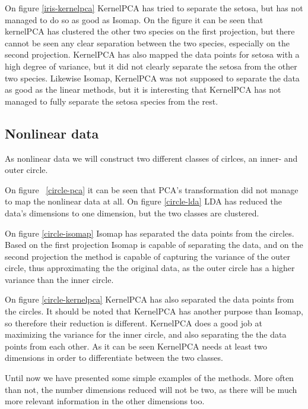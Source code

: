 On figure \ref{iris-kernelpca} KernelPCA has tried to separate the setosa, but has not managed to do so as good as Isomap. On the figure it can be seen that kernelPCA has clustered the other two species on the first projection, but there cannot be seen any clear separation between the two species, especially on the second projection. KernelPCA has also mapped the data points for setosa with a high degree of variance, but it did not clearly separate the setosa from the other two species. Likewise Isomap, KernelPCA was not supposed to separate the data as good as the linear methods, but it is interesting that KernelPCA has not managed to fully separate the setosa species from the rest.




\subsection{Nonlinear data}
As nonlinear data we will construct two different classes of cirlces, an inner- and outer circle.


On figure ~\ref{circle-pca} it can be seen that PCA's transformation did not manage to map the nonlinear data at all. On figure \ref{circle-lda} LDA has reduced the data's dimensions to one dimension, but the two classes are clustered.


On figure \ref{circle-isomap} Isomap has separated the data points from the circles. Based on the first projection Isomap is capable of separating the data, and on the second projection the method is capable of capturing the variance of the outer circle, thus approximating the the original data, as the outer circle has a higher variance than the inner circle.


On figure \ref{circle-kernelpca} KernelPCA has also separated the data points from the circles. It should be noted that KernelPCA has another purpose than Isomap, so therefore their reduction is different. KernelPCA does a good job at maximizing the variance for the inner circle, and also separating the the data points from each other. As it can be seen KernelPCA needs at least two dimensions in order to differentiate between the two classes. 


Until now we have presented some simple examples of the methods. More often than not, the number dimensions reduced will not be two, as there will be much more relevant information in the other dimensions too.

